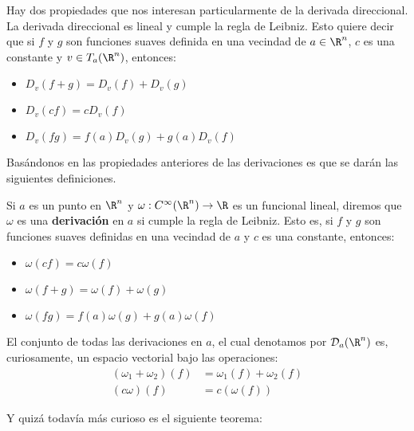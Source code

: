 \begin{frame}
  Hay dos propiedades que nos interesan particularmente de la derivada direccional. La derivada direccional es lineal y cumple la regla de Leibniz. Esto quiere decir que si $f$ y $g$ son funciones suaves definida en una vecindad de $a \in \R^n$, $c$ es una constante y $v \in T_{a}(\R^n)$, entonces:

  \begin{itemize}
    \item $D_v(f+g) = D_v(f) + D_v(g)$
    \item $D_v(cf) = cD_v(f)$
    \item $D_v(fg) = f(a)D_v(g) + g(a)D_v(f)$ 
  \end{itemize}
\end{frame}

\begin{frame}
  Basándonos en las propiedades anteriores de las derivaciones es que se darán las siguientes definiciones.
  \begin{definition}
    Si $a$ es un punto en $\R^n$ y $\omega: C^{\infty}(\R^{n}) \to \R$ es un funcional lineal, diremos que $\omega$ es una \textbf{derivación} en $a$ si cumple la regla de Leibniz. Esto es, si $f$ y $g$ son funciones suaves definidas en una vecindad de $a$ y $c$ es una constante, entonces:
    \begin{itemize}
      \item $\omega(cf) = c \omega(f)$
      \item $\omega(f+g) = \omega(f) + \omega(g)$
      \item $\omega(fg) = f(a)\omega(g) + g(a)\omega(f)$
    \end{itemize}
  \end{definition}

\end{frame}

\begin{frame}
  El conjunto de todas las derivaciones en $a$, el cual denotamos por $\mathcal{D}_a(\R^n)$ es, curiosamente, un espacio vectorial bajo las operaciones:
  \begin{align*}
    (\omega_1 + \omega_2)(f) &= \omega_1(f) + \omega_2(f)\\
    (c\omega)(f) &= c(\omega(f))
  \end{align*} \pause

  Y quizá todavía más curioso es el siguiente teorema:
\end{frame}

